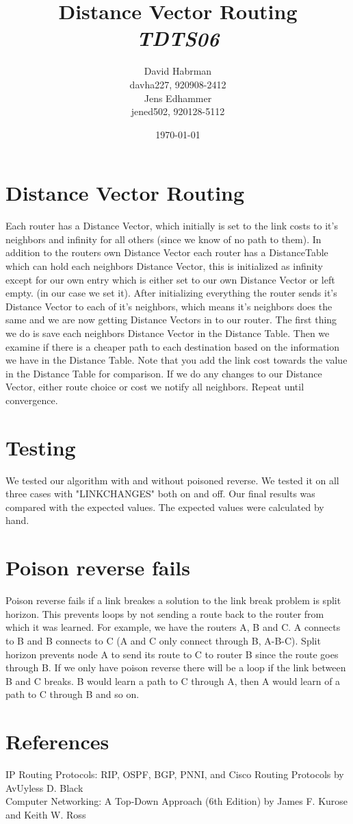 \documentclass[10pt]{article}
\title{Distance Vector Routing\\
\emph{TDTS06}}
\author{David Habrman \\ davha227, 920908-2412\\
Jens Edhammer \\ jened502, 920128-5112 }
\date{\today}
\begin{document}
\maketitle

\newpage
\tableofcontents
\newpage

\section{Distance Vector Routing}
Each router has a Distance Vector, which initially is set to the link costs to
it's neighbors and infinity for all others (since we know of no path to them).
In addition to the routers own Distance Vector each router has a DistanceTable
which can hold each neighbors Distance Vector, this is initialized as infinity
except for our own entry which is either set to our own Distance Vector or left
empty. (in our case we set it). After initializing everything the router sends
it's Distance Vector to each of it's neighbors, which means it's neighbors does
the same and we are now getting Distance Vectors in to our router. The first
thing we do is save each neighbors Distance Vector in the Distance Table. Then
we examine if there is a cheaper path to each destination based on the
information we have in the Distance Table. Note that you add the link cost 
towards the value in the Distance Table for comparison. If we do any changes
to our Distance Vector, either route choice or cost we notify all neighbors.
Repeat until convergence.

\section{Testing}
We tested our algorithm with and without poisoned reverse. We tested it on all
three cases with "LINKCHANGES" both on and off. Our final results was compared
with the expected values. The expected values were calculated by hand.

\section{Poison reverse fails}
Poison reverse fails if a link breakes a solution to the link break problem is
split horizon. This prevents loops by not sending a route back to the router
from which it was learned. For example, we have the routers A, B and C. A
connects to B and B connects to C (A and C only connect through B, A-B-C).
Split horizon prevents node A to send its route to C to router B since the
route goes through B. If we only have poison reverse there will be a loop
if the link between B and C breaks. B would learn a path to C through A,
then A would learn of a path to C through B and so on.

\section{References}
IP Routing Protocols: RIP, OSPF, BGP, PNNI, and Cisco Routing Protocols by  AvUyless D. Black \\
Computer Networking: A Top-Down Approach (6th Edition) by James F. Kurose and Keith W. Ross
\end{document}
